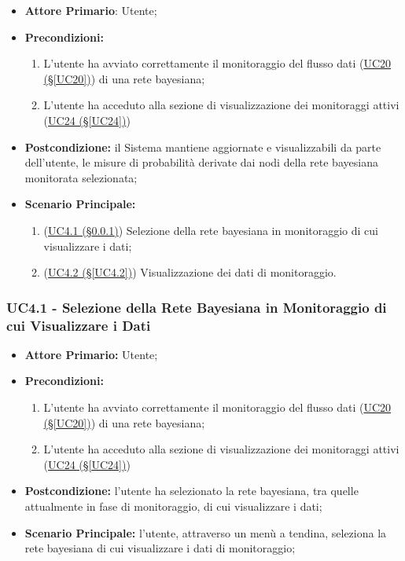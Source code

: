 \begin{itemize}
	\item \textbf{Attore Primario}: Utente;
	\item \textbf{Precondizioni:}
	\begin{enumerate}
		\item L'utente ha avviato correttamente il monitoraggio del flusso dati (\hyperref[UC20]{UC20 (§\ref*{UC20})}) di una rete bayesiana;
		\item L'utente ha acceduto alla sezione di visualizzazione dei monitoraggi attivi (\hyperref[UC24]{UC24 (§\ref*{UC24})})
	\end{enumerate}	 
	\item \textbf{Postcondizione:} il Sistema mantiene aggiornate e visualizzabili da parte dell'utente, le misure di probabilità derivate dai nodi della rete bayesiana monitorata selezionata;
	\item \textbf{Scenario Principale:} 
	\begin{enumerate}
		\item (\hyperref[UC4.1]{UC4.1 (§\ref*{UC4.1})}) Selezione della rete bayesiana in monitoraggio di cui visualizzare i dati;
		\item (\hyperref[UC4.2]{UC4.2 (§\ref*{UC4.2})}) Visualizzazione dei dati di monitoraggio.
	\end{enumerate}
\end{itemize}

\pagebreak

\subsubsection{UC4.1 - Selezione della Rete Bayesiana in Monitoraggio di cui Visualizzare i Dati}\label{UC4.1}

\begin{itemize}
	\item \textbf{Attore Primario:} Utente;
	\item \textbf{Precondizioni:} 
	\begin{enumerate}
		\item L'utente ha avviato correttamente il monitoraggio del flusso dati (\hyperref[UC20]{UC20 (§\ref*{UC20})}) di una rete bayesiana;
		\item L'utente ha acceduto alla sezione di visualizzazione dei monitoraggi attivi (\hyperref[UC24]{UC24 (§\ref*{UC24})})
	\end{enumerate}	 
	\item \textbf{Postcondizione:} l'utente ha selezionato la rete bayesiana, tra quelle attualmente in fase di monitoraggio, di cui visualizzare i dati;
	\item \textbf{Scenario Principale:} l'utente, attraverso un menù a tendina, seleziona la rete bayesiana di cui visualizzare i dati di monitoraggio;
\end{itemize}

